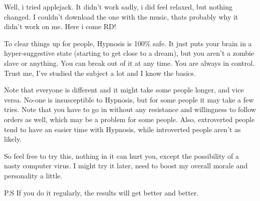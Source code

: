 \documentclass[ebook,12pt,oneside,openany]{memoir}
\begin{document}
\begin{tcolorbox}[title=The Original,colback=green!5!white,colframe=green!75!black,coltitle=white]
\par{Well, i tried applejack. It didn't work sadly, i did feel relaxed, but nothing changed. I couldn't download the one with the music, thats probably why it didn't work on me. Here i come RD!}
\end{tcolorbox}
\begin{tcolorbox}[title=Devvy \ding{170}Flutties\ding{170},colback=teal!5!white,colframe=teal!75!black,coltitle=white]
\par{To clear things up for people, Hypnosis is 100\% safe. It just puts your brain in a hyper-suggestive state (starting to get close to a dream), but you aren't a zombie slave or anything. You can break out of it at any time. You are always in control. Trust me, I've studied the subject a lot and I know the basics.}
\newline{}
\par{Note that everyone is different and it might take some people longer, and vice versa. No-one is insusceptible to Hypnosis, but for some people it may take a few tries. Note that you have to go in without any resistance and willingness to follow orders as well, which may be a problem for some people. Also, extroverted people tend to have an easier time with Hypnosis, while introverted people aren't as likely.}
\newline{}
\par{So feel free to try this, nothing in it can hurt you, except the possibility of a nasty computer virus. I might try it later, need to boost my overall morale and personality a little.}
\newline{}
\par{P.S If you do it regularly, the results will get better and better.}
\end{tcolorbox}
\end{document}

